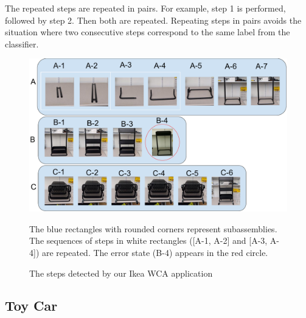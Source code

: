 The repeated steps are repeated in pairs. For example, step 1 is performed,
followed by step 2.
Then both are repeated.
Repeating steps in pairs avoids the situation where two consecutive steps
correspond to the same label from the classifier.

\begin{figure}
  \includegraphics[width=\columnwidth]{figures/ikea_subassemblies.pdf}
  \begin{captiontext}
    The blue rectangles with rounded corners represent subassemblies.
    The sequences of steps in white rectangles ([A-1, A-2] and [A-3, A-4])
    are repeated.
    The error state (B-4) appears in the red circle.
  \end{captiontext}
  \caption{
    The steps detected by our Ikea WCA application
  }\label{fig:ikea_cart}
\end{figure}

\subsection{Toy Car}\label{sec:toy_car}

